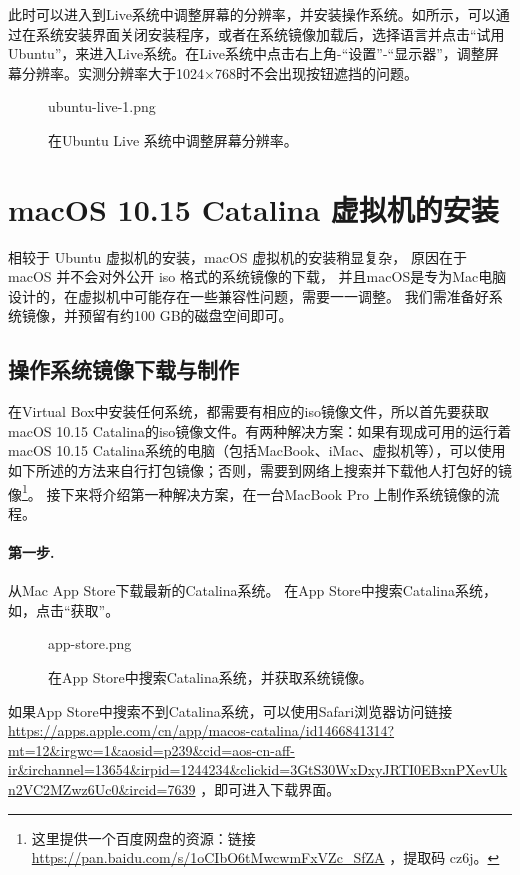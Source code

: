 \documentclass[final]{cvpr}
\newcommand{\mypara}[1]{\paragraph{#1.}}
\begin{document}
此时可以进入到Live系统中调整屏幕的分辨率，并安装操作系统。如所示，可以通过在系统安装界面关闭安装程序，或者在系统镜像加载后，选择语言并点击“试用 Ubuntu”，来进入Live系统。在Live系统中点击右上角-“设置”-“显示器”，调整屏幕分辨率。实测分辨率大于1024×768时不会出现按钮遮挡的问题。

\begin{figure}
  	\begin{overpic}[width=\columnwidth]{ubuntu-live-1.png}\end{overpic}
    \caption{在Ubuntu Live 系统中调整屏幕分辨率。}\label{fig:ubuntu-live}
\end{figure}


\section{macOS 10.15 Catalina 虚拟机的安装}\label{sec:mac}

相较于 Ubuntu 虚拟机的安装，macOS 虚拟机的安装稍显复杂，
原因在于 macOS 并不会对外公开 iso 格式的系统镜像的下载，
并且macOS是专为Mac电脑设计的，在虚拟机中可能存在一些兼容性问题，需要一一调整。
我们需准备好系统镜像，并预留有约100 GB的磁盘空间即可。

\subsection{\textbf{操作系统镜像下载与制作}}\label{sec:install-image}

在Virtual Box中安装任何系统，都需要有相应的iso镜像文件，所以首先要获取macOS 10.15 Catalina的iso镜像文件。有两种解决方案：如果有现成可用的运行着macOS 10.15 Catalina系统的电脑（包括MacBook、iMac、虚拟机等），可以使用如下所述的方法来自行打包镜像；否则，需要到网络上搜索并下载他人打包好的镜像\footnote{这里提供一个百度网盘的资源\cite{Web/installCatalina}：链接 \url{https://pan.baidu.com/s/1oCIbO6tMwcwmFxVZc_SfZA} ，提取码 cz6j。}。
接下来将介绍第一种解决方案，在一台MacBook Pro 上制作系统镜像的流程。

\mypara{第一步}  从Mac App Store下载最新的Catalina系统。
在App Store中搜索Catalina系统，如，点击“获取”。
\begin{figure}
  	\begin{overpic}[width=\columnwidth]{app-store.png}\end{overpic}
    \caption{在App Store中搜索Catalina系统，并获取系统镜像。}\label{fig:catalina-app-store}
\end{figure}
如果App Store中搜索不到Catalina系统，可以使用Safari浏览器访问链接
{ \small { \url{https://apps.apple.com/cn/app/macos-catalina/id1466841314?mt=12&irgwc=1&aosid=p239&cid=aos-cn-aff-ir&irchannel=13654&irpid=1244234&clickid=3GtS30WxDxyJRTI0EBxnPXevUkn2VC2MZwz6Uc0&ircid=7639} } }
，即可进入下载界面。
\end{document}
